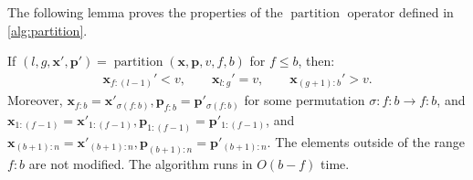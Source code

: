 The following lemma proves the properties of the $\operatorname{partition}$ operator defined in \cref{alg:partition}. 
\begin{lemma} \label{lem:hoare-partition}
If $(l, g, \bm{x}', \bm{p}') = \operatorname{partition}(\bm{x}, \bm{p}, v, f, b)$ for $f \le b$, then:
\begin{align} \label{eq:hoare-correspond}
  \bm{x}_{f{:}(l-1)}' < v, \qquad
  \bm{x}_{l{:}g}' = v,  \qquad
  \bm{x}_{(g+1){:}b}' > v.
\end{align}
Moreover, $ \bm{x}_{f{:}b} = \bm{x}'_{\sigma(f{:}b)}, \bm{p}_{f{:}b} = \bm{p}'_{\sigma(f{:}b)}$ for some permutation $\sigma\colon f{:}b \to f{:}b$, and $\bm{x}_{1{:}(f-1)} = \bm{x}'_{1{:}(f-1)}, \bm{p}_{1{:}(f-1)} = \bm{p}'_{1{:}(f-1)}$, and $\bm{x}_{(b+1):n} = \bm{x}'_{(b+1):n}, \bm{p}_{(b+1):n} = \bm{p}'_{(b+1):n}$. The elements outside of the range $f{:}b$ are not modified. The algorithm runs in $O(b - f)$ time.
\end{lemma}
